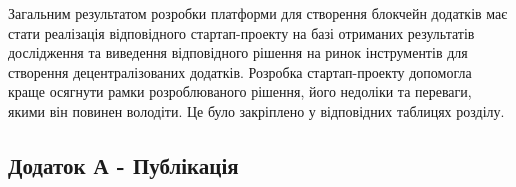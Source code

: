 \documentclass{lib/styles/default-style}
\begin{document}
    Загальним результатом розробки платформи для створення
    блокчейн додатків має стати реалізація відповідного стартап-проекту на базі отриманих
    результатів дослідження та виведення відповідного рішення на ринок
    інструментів для створення децентралізованих додатків. Розробка стартап-проекту допомогла
    краще осягнути рамки розроблюваного рішення, його недоліки та переваги,
    якими він повинен володіти. Це було закріплено у відповідних таблицях
    розділу.


\newpage
{}
\subsection*{Додаток А - Публікація}
\end{document}
